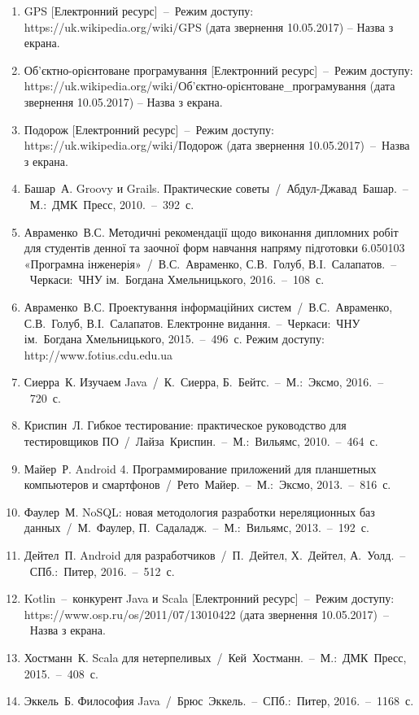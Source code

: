 \documentclass[../main.tex]{subfiles}
\begin{document}
\begin{enumerate}
	\item GPS [Електронний ресурс]~–~Режим доступу: https://uk.wikipedia.org/wiki/GPS (дата звернення 10.05.2017) – Назва з екрана.
	\item Об'єктно-орієнтоване програмування [Електронний ресурс]~–~Режим доступу: https://uk.wikipedia.org/wiki/Об'єктно-орієнтоване\_програмування (дата звернення 10.05.2017) – Назва з екрана.
	\item Подорож [Електронний ресурс]~–~Режим доступу: https://uk.wikipedia.org/wiki/Подорож (дата звернення 10.05.2017)~–~Назва з екрана.
	\item Башар~А. Groovy и Grails. Практические советы~/~Абдул-Джавад~Башар.~–~М.:~ДМК~Пресс, 2010.~–~392~с.
	\item Авраменко~В.С. Методичні рекомендації щодо виконання дипломних робіт для студентів денної та заочної форм навчання напряму підготовки 6.050103 «Програмна інженерія»~/~В.С.~Авраменко, С.В.~Голуб, В.І.~Салапатов.~–~Черкаси:~ЧНУ ім.~Богдана Хмельницького, 2016.~–~108~с.
	\item Авраменко~В.С. Проектування інформаційних систем~/~В.С.~Авраменко, С.В.~Голуб, В.І.~Салапатов. Електронне видання.~–~Черкаси:~ЧНУ ім.~Богдана Хмельницького, 2015.~–~496~с. Режим доступу: http://www.fotius.cdu.edu.ua
	\item Сиерра~К. Изучаем Java~/~К.~Сиерра, Б.~Бейтс.~–~М.:~Эксмо, 2016.~–~720~с.
	\item Криспин~Л. Гибкое тестирование: практическое руководство для тестировщиков ПО~/~Лайза~Криспин.~–~М.:~Вильямс, 2010.~–~464~с.
	\item Майер~Р. Android 4. Программирование приложений для планшетных компьютеров и смартфонов~/~Рето~Майер.~–~М.:~Эксмо, 2013.~–~816~с.
	\item Фаулер~М. NoSQL: новая методология разработки нереляционных баз данных~/~М.~Фаулер, П.~Садаладж.~–~М.:~Вильямс, 2013.~–~192~с.
	\item Дейтел~П. Android для разработчиков~/~П.~Дейтел, Х.~Дейтел, А.~Уолд.~–~СПб.:~Питер, 2016.~–~512~с.
	\item Kotlin~–~конкурент Java и Scala [Електронний ресурс]~–~Режим доступу: https://www.osp.ru/os/2011/07/13010422 (дата звернення 10.05.2017)~–~Назва з екрана.
	\item Хостманн~К. Scala для нетерпеливых~/~Кей~Хостманн.~–~М.:~ДМК~Пресс, 2015.~–~408~с.
	\item Эккель~Б. Философия Java~/~Брюс~Эккель.~–~СПб.:~Питер, 2016.~–~1168~с.
\end{enumerate}
	
\end{document}
